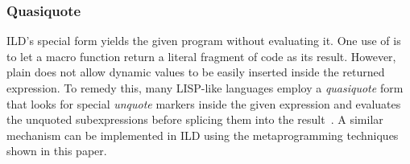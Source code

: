 \subsubsection{Quasiquote}
ILD's  special form yields the given program without
evaluating it. One use of  is to let a macro function return
a literal fragment of code as its result. However,
plain  does not allow dynamic values to be easily inserted
inside the returned expression. To remedy this, many LISP-like languages
employ a \emph{quasiquote} form that looks for special \emph{unquote} markers
inside the given expression and evaluates the unquoted subexpressions before
splicing them into the result~\cite{bawden-quasiquote}. A similar mechanism can be implemented
in ILD using the metaprogramming techniques shown in this paper.
